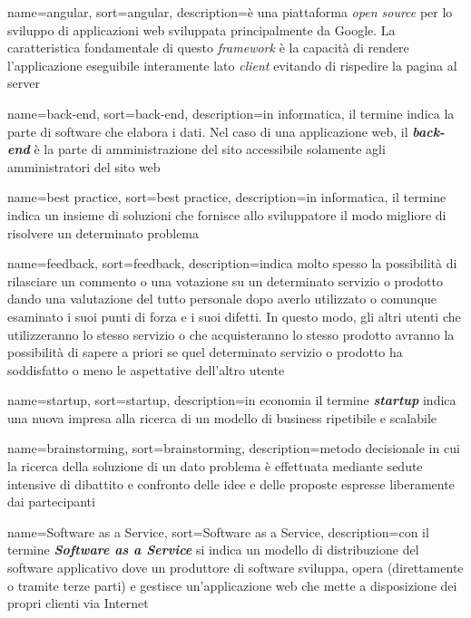 {
    name=angular,
    sort=angular,
    description={è una piattaforma \textit{open source} per lo sviluppo di applicazioni web sviluppata principalmente da Google. La caratteristica fondamentale di questo \textit{framework} è la capacità di rendere l’applicazione eseguibile interamente lato \textit{client} evitando di rispedire la pagina al server}
}

{
    name=back-end,
    sort=back-end,
    description={in informatica, il termine indica la parte di software che elabora i dati. Nel caso di una applicazione web, il \textit{\textbf{back-end}} è la parte di amministrazione del sito accessibile solamente agli amministratori del sito web}
}

{
    name=best practice,
    sort=best practice,
    description={in informatica, il termine indica un insieme di soluzioni che fornisce allo sviluppatore il modo migliore di risolvere un determinato problema}
}

{
    name=feedback,
    sort=feedback,
    description={indica molto spesso la possibilità di rilasciare un commento o una votazione su un determinato servizio o prodotto dando una valutazione del tutto personale dopo averlo utilizzato o comunque esaminato i suoi punti di forza e i suoi difetti. In questo modo, gli altri utenti che utilizzeranno lo stesso servizio o che acquisteranno lo stesso prodotto avranno la possibilità di sapere a priori se quel determinato servizio o prodotto ha soddisfatto o meno le aspettative dell’altro utente}
}

{
    name=startup,
    sort=startup,
    description={in economia il termine \textit{\textbf{startup}} indica una nuova impresa alla ricerca di un modello di business ripetibile e scalabile}
}

{
    name=brainstorming,
    sort=brainstorming,
    description={metodo decisionale in cui la ricerca della soluzione di un dato problema è effettuata mediante sedute intensive di dibattito e confronto delle idee e delle proposte espresse liberamente dai partecipanti}
}

{
    name=Software as a Service,
    sort=Software as a Service,
    description={con il termine \textit{\textbf{Software as a Service}} si indica un modello di distribuzione del software applicativo dove un produttore di software sviluppa, opera (direttamente o tramite terze parti) e gestisce un'applicazione web che mette a disposizione dei propri clienti via Internet }
}


